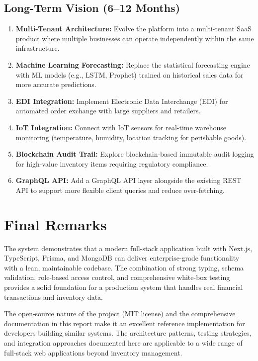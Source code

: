 ﻿\documentclass[12pt,a4paper]{report}
\begin{document}
\subsection{Long-Term Vision (6--12 Months)}

\begin{enumerate}[leftmargin=1.5em]
  \item \textbf{Multi-Tenant Architecture:} Evolve the platform into a multi-tenant SaaS product where multiple businesses can operate independently within the same infrastructure.
  \item \textbf{Machine Learning Forecasting:} Replace the statistical forecasting engine with ML models (e.g., LSTM, Prophet) trained on historical sales data for more accurate predictions.
  \item \textbf{EDI Integration:} Implement Electronic Data Interchange (EDI) for automated order exchange with large suppliers and retailers.
  \item \textbf{IoT Integration:} Connect with IoT sensors for real-time warehouse monitoring (temperature, humidity, location tracking for perishable goods).
  \item \textbf{Blockchain Audit Trail:} Explore blockchain-based immutable audit logging for high-value inventory items requiring regulatory compliance.
  \item \textbf{GraphQL API:} Add a GraphQL API layer alongside the existing REST API to support more flexible client queries and reduce over-fetching.
\end{enumerate}

\section{Final Remarks}

The system demonstrates that a modern full-stack application built with Next.js, TypeScript, Prisma, and MongoDB can deliver enterprise-grade functionality with a lean, maintainable codebase. The combination of strong typing, schema validation, role-based access control, and comprehensive white-box testing provides a solid foundation for a production system that handles real financial transactions and inventory data.

The open-source nature of the project (MIT license) and the comprehensive documentation in this report make it an excellent reference implementation for developers building similar systems. The architecture patterns, testing strategies, and integration approaches documented here are applicable to a wide range of full-stack web applications beyond inventory management.
\end{document}
